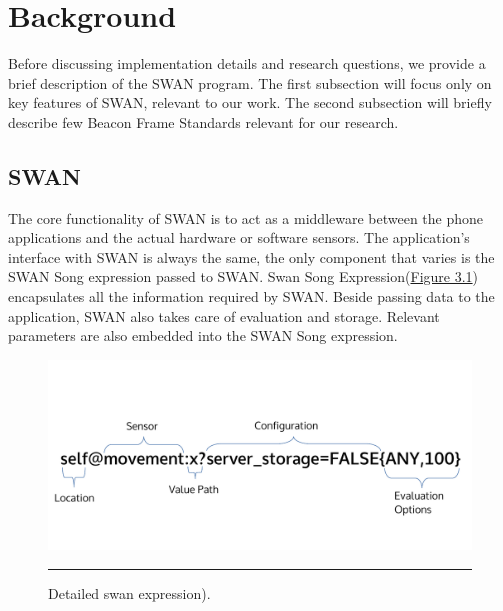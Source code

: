 
\chapter{Background} %

\label{Chapter3} %


Before discussing implementation details and research questions, we provide a brief description of the SWAN program.
The first subsection will focus only on key features of SWAN, relevant to our work.
The second subsection will briefly describe few Beacon Frame Standards relevant for our research.

\section{SWAN}
The core functionality of SWAN is to act as a middleware between the phone applications and the actual hardware or software sensors.
The application's interface with SWAN is always the same, the only component that varies is the SWAN Song expression passed to SWAN.
Swan Song Expression(\hyperref[fig:SwanExpression]{Figure 3.1}) encapsulates all the information required by SWAN.
Beside passing data to the application, SWAN also takes care of evaluation and storage. Relevant parameters are also embedded into the 
SWAN Song expression.

\begin{figure}[htbp]
  \centering
    \includegraphics[scale=0.6]{Figures/swan_expr.pdf}
    \rule{35em}{0.5pt}
  \caption[Swan Expression]{Detailed swan expression).}
  \label{fig:SwanExpression}
\end{figure}

